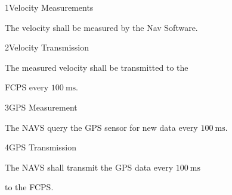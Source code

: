 \req
	{1}{Velocity Measurements}
	{

        The velocity shall be measured by the Nav Software.

    }
	{}

\req
	{2}{Velocity Transmission}
	{

        The measured velocity shall be transmitted to the

        FCPS every $\SI{100}{\milli \second}$.

    }
	{}

\req
	{3}{GPS Measurement}
	{

        The NAVS query the GPS sensor for new data every $\SI{100}{\milli\second}$.

    }
	{}

\req
	{4}{GPS Transmission}
	{

        The NAVS shall transmit the GPS data every $\SI{100}{\milli\second}$

        to the FCPS.

    }
	{}

